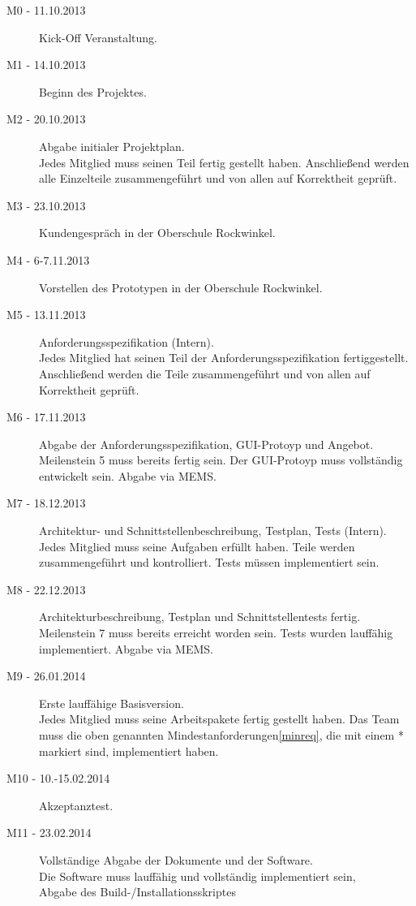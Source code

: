 \documentclass[fontsize=12pt,paper=a4,twoside]{scrartcl}
\begin{document}
\begin{description}
\item[M0 - 11.10.2013] Kick-Off Veranstaltung.

\item[M1 - 14.10.2013] Beginn des Projektes.

\item[M2 - 20.10.2013] Abgabe initialer Projektplan.\\
Jedes Mitglied muss seinen Teil fertig gestellt haben. Anschließend werden alle Einzelteile zusammengeführt und von allen auf Korrektheit geprüft.

\item[M3 - 23.10.2013] Kundengespräch in der Oberschule Rockwinkel.

\item[M4 - 6-7.11.2013] Vorstellen des Prototypen in der Oberschule Rockwinkel.

\item[M5 - 13.11.2013] Anforderungsspezifikation (Intern). \\
Jedes Mitglied hat seinen Teil der Anforderungsspezifikation fertiggestellt. Anschließend werden die Teile zusammengeführt und von allen auf Korrektheit geprüft.

\item[M6 - 17.11.2013] Abgabe der Anforderungsspezifikation, GUI-Protoyp und Angebot. \\
Meilenstein 5 muss bereits fertig sein. Der GUI-Protoyp muss vollständig entwickelt sein. Abgabe via MEMS.

\item[M7 - 18.12.2013] Architektur- und Schnittstellenbeschreibung, Testplan, Tests (Intern).\\
Jedes Mitglied muss seine Aufgaben erfüllt haben. Teile werden zusammengeführt und kontrolliert. Tests müssen implementiert sein.

\item[M8 - 22.12.2013] Architekturbeschreibung, Testplan und Schnittstellentests fertig.\\
Meilenstein 7 muss bereits erreicht worden sein. Tests wurden lauffähig implementiert. Abgabe via MEMS.

\item[M9 - 26.01.2014] Erste lauffähige Basisversion.\\
Jedes Mitglied muss seine Arbeitspakete fertig gestellt haben. Das Team muss die oben genannten Mindestanforderungen\ref{minreq}, die mit einem * markiert sind, implementiert haben.

\item[M10 - 10.-15.02.2014] Akzeptanztest.

\item[M11 - 23.02.2014] Vollständige Abgabe der Dokumente und der Software. \\
Die Software muss lauffähig und vollständig implementiert sein,\\
Abgabe des Build-/Installationsskriptes
\end{description}
\end{document}
